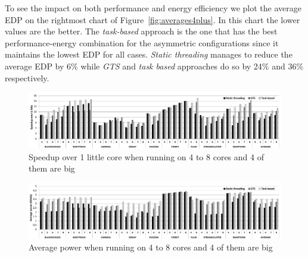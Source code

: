 To see the impact on both performance and energy efficiency we plot the average EDP on the 
rightmost chart of Figure~\ref{fig:averages4plus}. In this chart the lower values are the better. The \emph{task-based} approach is the one that has the best performance-energy 
combination for the asymmetric configurations since it maintains the lowest EDP for all cases. 
\emph{Static threading} manages to reduce the average EDP by 6\% while \emph{GTS} and \emph{task 
based} approaches do so by 24\% and 36\% respectively.
\begin{figure}[t]%
	\centering
	\includegraphics[width=1.0\textwidth]{figures/speedup-4plus.pdf}
	\vspace{-0.5cm}
	\caption{Speedup over 1 little core when running on 4 to 8 cores and 4 of them are big}
	\label{fig:speedup4plus}%
\end{figure}
\begin{figure}[t]%
	\centering
	\includegraphics[width=1.0\textwidth]{figures/power4plus.pdf}
	\vspace{-0.5cm}
	\caption{Average power when running on 4 to 8 cores and 4 of them are big}
	\label{fig:power4plus}%
\end{figure}

